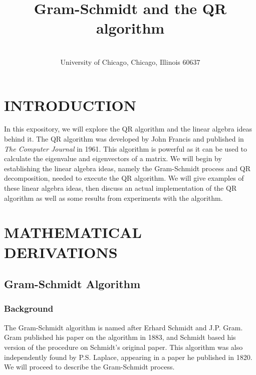 \documentclass[onecolumn]{webofc}
\begin{document}
%
\title{Gram-Schmidt and the QR algorithm}
%
%

\author{ \\\small{University of Chicago, Chicago, Illinois 60637}
}

\abstract{%

}
%
\maketitle
%
\section{INTRODUCTION}
\label{intro}
In this expository, we will explore the QR algorithm and the linear algebra ideas behind it. The QR algorithm was developed by John Francis and published in \textit{The Computer Journal} in 1961\cite{RefA}.  This algorithm is powerful as it can be used to calculate the eigenvalue and eigenvectors of a matrix. We will begin by establishing the linear algebra ideas, namely the Gram-Schmidt process and QR decomposition, needed to execute the QR algorithm. We will give examples of these linear algebra ideas, then discuss an actual implementation of the QR algorithm as well as some results from experiments with the algorithm.


\section{MATHEMATICAL DERIVATIONS}
\subsection{Gram-Schmidt Algorithm}
\subsubsection*{Background}
The Gram-Schmidt algorithm is named after Erhard Schmidt and J.P. Gram. Gram published his paper on the algorithm in 1883, and Schmidt based his version of the procedure on Schmidt's original paper. This algorithm was also independently found by P.S. Laplace, appearing in a paper he published in 1820. We will proceed to describe the Gram-Schmidt process\cite{RefB}.
\end{document}
